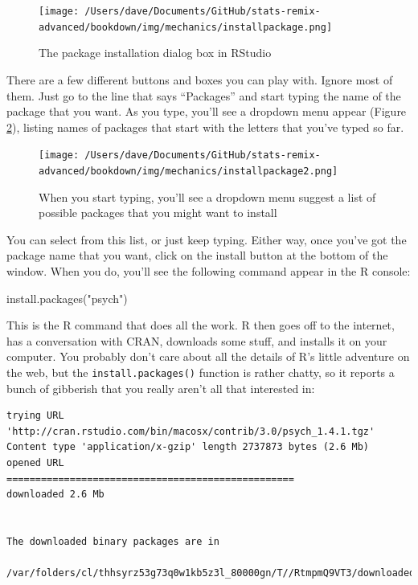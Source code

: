 \documentclass[
]{book}
\newenvironment{Shaded}{\begin{snugshade}}{\end{snugshade}}
\newcommand{\FunctionTok}[1]{\textcolor[rgb]{0.00,0.00,0.00}{#1}}
\newcommand{\NormalTok}[1]{#1}
\newcommand{\StringTok}[1]{\textcolor[rgb]{0.31,0.60,0.02}{#1}}
\begin{document}
\begin{figure}
\centering
\texttt{[image: /Users/dave/Documents/GitHub/stats-remix-advanced/bookdown/img/mechanics/installpackage.png]}
\caption{\label{fig:packageinstalla}The package installation dialog box in RStudio}
\end{figure}

There are a few different buttons and boxes you can play with. Ignore most of them. Just go to the line that says ``Packages'' and start typing the name of the package that you want. As you type, you'll see a dropdown menu appear (Figure \ref{fig:packageinstallb}), listing names of packages that start with the letters that you've typed so far.

\begin{figure}
\centering
\texttt{[image: /Users/dave/Documents/GitHub/stats-remix-advanced/bookdown/img/mechanics/installpackage2.png]}
\caption{\label{fig:packageinstallb}When you start typing, you'll see a dropdown menu suggest a list of possible packages that you might want to install}
\end{figure}

You can select from this list, or just keep typing. Either way, once you've got the package name that you want, click on the install button at the bottom of the window. When you do, you'll see the following command appear in the R console:

\begin{Shaded}
\begin{Highlighting}[]
\FunctionTok{install.packages}\NormalTok{(}\StringTok{"psych"}\NormalTok{)}
\end{Highlighting}
\end{Shaded}

This is the R command that does all the work. R then goes off to the internet, has a conversation with CRAN, downloads some stuff, and installs it on your computer. You probably don't care about all the details of R's little adventure on the web, but the \texttt{install.packages()} function is rather chatty, so it reports a bunch of gibberish that you really aren't all that interested in:

\begin{verbatim}
trying URL 'http://cran.rstudio.com/bin/macosx/contrib/3.0/psych_1.4.1.tgz'
Content type 'application/x-gzip' length 2737873 bytes (2.6 Mb)
opened URL
==================================================
downloaded 2.6 Mb


The downloaded binary packages are in
    /var/folders/cl/thhsyrz53g73q0w1kb5z3l_80000gn/T//RtmpmQ9VT3/downloaded_packages
\end{verbatim}
\end{document}
